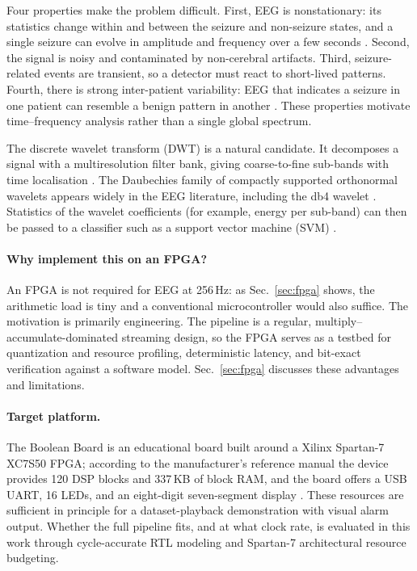 \documentclass[10pt,twocolumn,letterpaper]{article}
\begin{document}
Four properties make the problem difficult. First, EEG is nonstationary:
its statistics change within and between the seizure and non-seizure
states, and a single seizure can evolve in amplitude and frequency over
a few seconds \cite{shoeb2010icml}. Second, the signal is noisy and
contaminated by non-cerebral artifacts. Third, seizure-related events
are transient, so a detector must react to short-lived patterns. Fourth,
there is strong inter-patient variability: EEG that indicates a seizure
in one patient can resemble a benign pattern in another
\cite{shoeb2010icml}. These properties motivate time--frequency analysis
rather than a single global spectrum.

The discrete wavelet transform (DWT) is a natural candidate. It
decomposes a signal with a multiresolution filter bank, giving
coarse-to-fine sub-bands with time localisation \cite{mallat1989theory}.
The Daubechies family of compactly supported orthonormal wavelets
\cite{daubechies1988orthonormal} appears widely in the EEG literature,
including the db4 wavelet \cite{shen2022dwt,subasi2007eeg}.
Statistics of the wavelet coefficients (for example, energy per
sub-band) can then be passed to a classifier such as a support vector
machine (SVM) \cite{cortes1995support}.

\paragraph{Why implement this on an FPGA?} An FPGA is not required for
EEG at 256\,Hz: as Sec.~\ref{sec:fpga} shows, the arithmetic load is
tiny and a conventional microcontroller would also suffice. The
motivation is primarily engineering. The pipeline is a regular,
multiply--accumulate-dominated streaming design, so the FPGA serves as a
testbed for quantization and resource profiling, deterministic latency,
and bit-exact verification against a software model.
Sec.~\ref{sec:fpga} discusses these advantages and limitations.

\paragraph{Target platform.} The Boolean Board is an educational board
built around a Xilinx Spartan-7 XC7S50 FPGA; according to the
manufacturer's reference manual the device provides 120 DSP blocks and
337\,KB of block RAM, and the board offers a USB UART, 16 LEDs, and an
eight-digit seven-segment display \cite{realdigital2024boolean}. These
resources are sufficient in principle for a dataset-playback
demonstration with visual alarm output. Whether the full pipeline fits,
and at what clock rate, is evaluated in this work through cycle-accurate
RTL modeling and Spartan-7 architectural resource budgeting.
\end{document}
